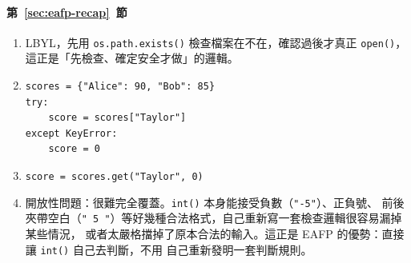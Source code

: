 \paragraph{第~\ref{sec:eafp-recap}~節}
\begin{enumerate}
\item LBYL，先用 \texttt{os.path.exists()} 檢查檔案在不在，確認過後才真正 \texttt{open()}，
這正是「先檢查、確定安全才做」的邏輯。
\item
\begin{verbatim}
scores = {"Alice": 90, "Bob": 85}
try:
    score = scores["Taylor"]
except KeyError:
    score = 0
\end{verbatim}
\item \texttt{score = scores.get("Taylor", 0)}
\item 開放性問題：很難完全覆蓋。\texttt{int()} 本身能接受負數（\texttt{"-5"}）、正負號、
前後夾帶空白（\texttt{" 5 "}）等好幾種合法格式，自己重新寫一套檢查邏輯很容易漏掉某些情況，
或者太嚴格擋掉了原本合法的輸入。這正是 EAFP 的優勢：直接讓 \texttt{int()} 自己去判斷，不用
自己重新發明一套判斷規則。
\end{enumerate}
